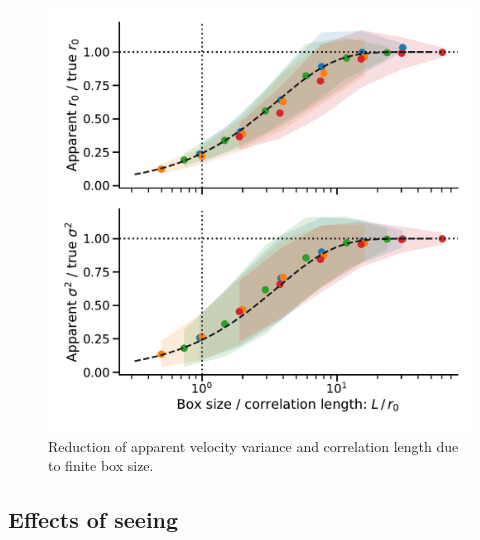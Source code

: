 \documentclass[fleqn,usenatbib, useAMS, a4paper]{mnras}
\begin{document}
\begin{figure}
  \includegraphics[width=\linewidth]{Figures/fake-finite-box-effect}
  \caption{
    Reduction of apparent velocity variance and correlation length
    due to finite box size.
  }
  \label{fig:finite-box-effect}
\end{figure}



\subsection{Effects of seeing}
\label{sec:effects-seeing-struc}
\end{document}
